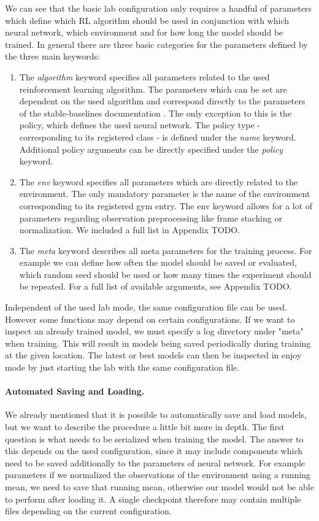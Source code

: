 We can see that the basic lab configuration only requires a handful of parameters which define which RL algorithm should be used in conjunction with which neural network, which environment and for how long the model should be trained. In general there are three basic categories for the parameters defined by the three main keywords: 

\begin{enumerate}
    \item The \textit{algorithm} keyword specifies all parameters related to the used reinforcement learning algorithm. The parameters which can be set are dependent on the used algorithm and correspond directly to the parameters of the stable-baselines documentation \cite{stable-baselines-docs}. The only exception to this is the policy, which defines the used neural network. The policy type - corresponding to its registered class - is defined under the \textit{name} keyword. Additional policy arguments can be directly specified under the \textit{policy} keyword.
    \item The \textit{env} keyword specifies all parameters which are directly related to the environment. The only mandatory parameter is the name of the environment corresponding to its registered gym entry. The env keyword allows for a lot of parameters regarding observation preprocessing like frame stacking or normalization. We included a full list in Appendix TODO. 
    \item  The \textit{meta} keyword describes all meta parameters for the training process. For example we can define how often the model should be saved or evaluated, which random seed should be used or how many times the experiment should be repeated. For a full list of available arguments, see Appendix TODO.
\end{enumerate}

Independent of the used lab mode, the same configuration file can be used. However some functions may depend on certain configurations. If we want to inspect an already trained model, we must specify a log directory under "meta" when training. This will result in models being saved periodically during training at the given location. The latest or best models can then be inspected in enjoy mode by just starting the lab with the same configuration file. 

\paragraph{Automated Saving and Loading.}
We already mentioned that it is possible to automatically save and load models, but we want to describe the procedure a little bit more in depth. The first question is what needs to be serialized when training the model. The answer to this depends on the used configuration, since it may include components which need to be saved additionally to the parameters of neural network. For example parameters if we normalized the observations of the environment using a running mean, we need to save that running mean, otherwise our model would not be able to perform after loading it. A single checkpoint therefore may contain multiple files depending on the current configuration.

